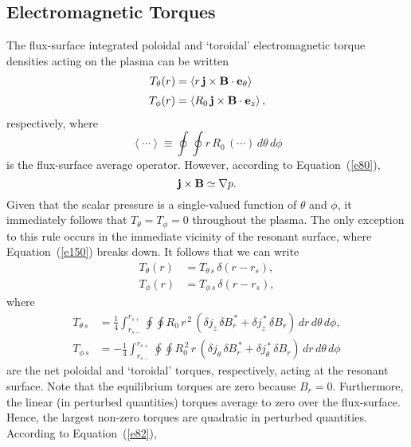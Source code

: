 \documentclass[notitlepage,12pt]{article}
\begin{document}
{\subsection{Electromagnetic Torques}\label{storque}
The flux-surface integrated poloidal and `toroidal' electromagnetic torque densities acting on the plasma
can be written
\begin{align}\label{e152}
T_\theta(r) &= \left\langle r\,{\bf j}\times {\bf B}\cdot {\bf e}_\theta\right\rangle\\[0.5ex]
T_\phi(r) &= \left\langle R_0\,{\bf j}\times {\bf B}\cdot {\bf e}_z\right\rangle,
\end{align}
respectively, 
where
\begin{equation}
\left\langle\cdots\right\rangle \equiv \oint\oint r\,R_0\,(\cdots)\,d\theta\,d\phi
\end{equation}
is the flux-surface average operator. 
 However, according to Equation~(\ref{e80}),
\begin{equation}\label{e150}
{\bf j}\times {\bf B} \simeq \nabla p.
\end{equation}
Given that the scalar pressure is a single-valued function of $\theta$ and $\phi$, it immediately follows
that $T_\theta=T_\phi = 0$ throughout the plasma. The only exception to this rule occurs in the immediate vicinity of the
resonant surface, where Equation~(\ref{e150}) breaks down. It follows that we can write
\begin{align}\label{e156a}
T_\theta(r) &= T_{\theta\,s}\,\delta(r-r_s),\\[0.5ex]
T_\phi(r) &= T_{\phi\,s}\,\delta(r-r_s),
\end{align}
where
\begin{align}\label{e153}
T_{\theta\,s} &=  \frac{1}{4}\int_{r_{s-}}^{r_{s+}}\oint\oint R_0\,r^{\,2}\,(\delta j_z\,\delta B_r^{\,\ast} + \delta j_z^{\,\ast}\,\delta B_r)\,dr\,d\theta\,d\phi,\\[0.5ex]
T_{\phi\,s} &=  -\frac{1}{4}\int_{r_{s-}}^{r_{s+}}\oint\oint R_0^{\,2}\,r\,(\delta j_\theta\,\delta B_r^{\,\ast} + \delta j_\theta^{\,\ast}\,\delta B_r)\,dr\,d\theta\,d\phi
\end{align}
are the net poloidal and `toroidal' torques, respectively, acting at the resonant surface. 
Note that the equilibrium torques are zero because $B_r=0$. Furthermore, the linear (in perturbed quantities) torques 
average to zero over the flux-surface. Hence, the largest non-zero torques  are quadratic in perturbed quantities. 
According to Equation~(\ref{e82}), 
\begin{equation}

\end{equation}}
\end{document}
